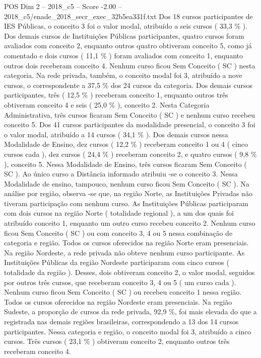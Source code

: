 \begin{textsample}{POS Dim 2 – 2018\_c5 – Score -2.00 – 2018\_c5/enade\_2018\_secr\_exec\_32b5ea331f.txt}
Dos 18 cursos participantes de IES Públicas, o conceito 3 foi o valor modal, atribuído a seis cursos ( 33,3 \% ).
Dos demais cursos de Instituições Públicas participantes, quatro cursos foram avaliados com conceito 2, enquanto outros quatro obtiveram conceito 5, como já comentado e dois cursos ( 11,1 \% ) foram avaliados com conceito 1, enquanto outros dois receberam conceito 4.
Nenhum curso ficou Sem Conceito ( SC ) nesta categoria.
Na rede privada, também, o conceito modal foi 3, atribuído a nove cursos, o correspondente a 37,5 \% dos 24 cursos da categoria.
Dos demais cursos participantes, três ( 12,5 \% ) receberam conceito 1, enquanto outros três obtiveram conceito 4 e seis ( 25,0 \% ), conceito 2.
Nesta Categoria Administrativa, três cursos ficaram Sem Conceito ( SC ) e nenhum curso recebeu conceito 5.
Dos 41 cursos participantes da modalidade presencial, o conceito 3 foi o valor modal, atribuído a 14 cursos ( 34,1 \% ).
Dos demais cursos nessa Modalidade de Ensino, dez cursos ( 12,2 \% ) receberam conceito 1 ou 4 ( cinco cursos cada ), dez cursos ( 24,4 \% ) receberam conceito 2, e quatro cursos ( 9,8 \% ), conceito 5.
Nessa Modalidade de Ensino, três cursos ficaram Sem Conceito ( SC ).
Ao único curso a Distância informado atribuiu -se o conceito 3.
Nessa Modalidade de ensino, tampouco, nenhum curso ficou Sem Conceito ( SC ).
Na análise por região, observa -se que, na região Norte, as Instituições Privadas não tiveram participação com nenhum curso.
As Instituições Públicas participaram com dois cursos na região Norte ( totalidade regional ), a um dos quais foi atribuído conceito 1, enquanto um outro curso recebeu conceito 2.
Nenhum curso ficou Sem Conceito ( SC ) ou com conceito 3, 4 ou 5 nessa combinação de categoria e região.
Todos os cursos oferecidos na região Norte eram presenciais.
Na região Nordeste, a rede privada não obteve nenhum curso participante.
As Instituições Públicas da região Nordeste participaram com cinco cursos ( totalidade da região ).
Desses, dois obtiveram conceito 2, o valor modal, seguidos por outros três cursos, que receberam conceito 3, 4 ou 5 ( um curso cada ).
Nenhum curso ficou Sem Conceito ( SC ) ou recebeu conceito 1 nessa região.
Todos os cursos oferecidos na região Nordeste eram presenciais.
Na região Sudeste, a proporção de cursos da rede privada, 92,9 \%, foi mais elevada do que a registrada nas demais regiões brasileiras, correspondendo a 13 dos 14 cursos participantes.
Nessa categoria e região, o conceito modal foi 3, atribuído a cinco cursos.
Três cursos ( 23,1 \% ) obtiveram conceito 2, enquanto outros três receberam conceito 4.

\end{textsample}
